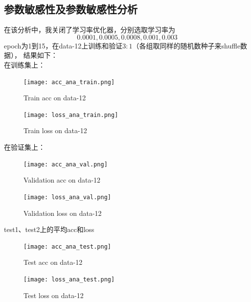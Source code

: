 \documentclass[12pt, a4paper, oneside]{ctexart}
\begin{document}
\subsection{参数敏感性及参数敏感性分析}
在该分析中，我关闭了学习率优化器，分别选取学习率为\[0.0001,0.0005,0.0008,0.001,0.003\]epoch为1到15，在data-12上训练和验证\(3:1\)（各组取同样的随机数种子来shuffle数据），
结果如下：\\
在训练集上：
\begin{figure}[H]  
    \begin{minipage}[H]{0.5\linewidth} %
            \centering
            \texttt{[image: acc\_ana\_train.png]}
            \caption{Train acc on data-12}
     \end{minipage}
     \begin{minipage}[H]{0.5\linewidth} %
         \hspace{2mm}%
         \texttt{[image: loss\_ana\_train.png]}
         \caption{Train loss on data-12}
      \end{minipage}
\end{figure}
在验证集上：
\begin{figure}[H]  
    \begin{minipage}[H]{0.5\linewidth} %
            \centering
            \texttt{[image: acc\_ana\_val.png]}
            \caption{Validation acc on data-12}
     \end{minipage}
     \begin{minipage}[H]{0.5\linewidth} %
         \hspace{2mm}%
         \texttt{[image: loss\_ana\_val.png]}
         \caption{Validation loss on data-12}
      \end{minipage}
\end{figure}
test1、test2上的平均acc和loss
\begin{figure}[H]  
    \begin{minipage}[H]{0.5\linewidth} %
            \centering
            \texttt{[image: acc\_ana\_test.png]}
            \caption{Test acc on data-12}
     \end{minipage}
     \begin{minipage}[H]{0.5\linewidth} %
         \hspace{2mm}%
         \texttt{[image: loss\_ana\_test.png]}
         \caption{Test loss on data-12}
      \end{minipage}
\end{figure}
\end{document}
